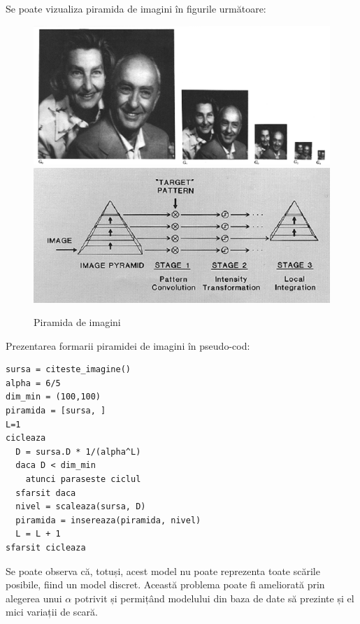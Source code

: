 Se poate vizualiza piramida de imagini în figurile următoare:

\begin{figure}[H]
	\centering
		\includegraphics[width=1.0\textwidth]{imagini/pyramid0.png}
		\includegraphics[width=1.0\textwidth]{imagini/pyramid1.png}
	\caption{Piramida de imagini\protect\footnotemark}
	\label{fig:Pyramids_Tutorial_Pyramid_Theory}
\end{figure}



Prezentarea formarii piramidei de imagini în pseudo-cod:
\begin{mdframed}
\begin{verbatim}
sursa = citeste_imagine()
alpha = 6/5
dim_min = (100,100)
piramida = [sursa, ]
L=1
cicleaza
  D = sursa.D * 1/(alpha^L)
  daca D < dim_min
    atunci paraseste ciclul
  sfarsit daca
  nivel = scaleaza(sursa, D)
  piramida = insereaza(piramida, nivel)
  L = L + 1
sfarsit cicleaza
\end{verbatim}
\end{mdframed}

Se poate observa că, totuși, acest model nu poate reprezenta toate scările posibile, fiind un model discret.
Această problema poate fi ameliorată prin alegerea unui ${\alpha}$ potrivit și permițând modelului din baza de date să prezinte și el mici variații de scară.

